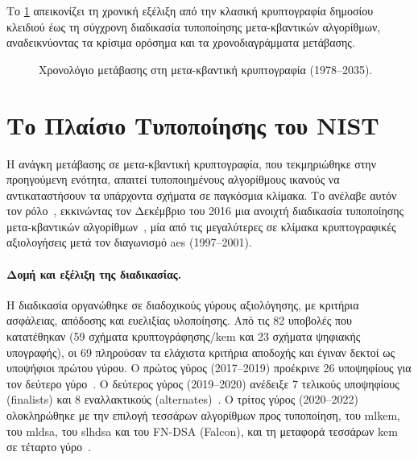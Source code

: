 Το \cref{fig:timeline-pqc} απεικονίζει τη χρονική εξέλιξη από την κλασική
κρυπτογραφία δημοσίου κλειδιού έως τη σύγχρονη διαδικασία τυποποίησης
μετα-κβαντικών αλγορίθμων, αναδεικνύοντας τα κρίσιμα ορόσημα και τα
χρονοδιαγράμματα μετάβασης.

\begin{figure}[htbp]
  \centering
  
  \caption{Χρονολόγιο μετάβασης στη μετα-κβαντική κρυπτογραφία (1978–2035).}
  \label{fig:timeline-pqc}
\end{figure}

\section{Το Πλαίσιο Τυποποίησης του NIST}
\label{sec:nist-standardization}

Η ανάγκη μετάβασης σε μετα-κβαντική κρυπτογραφία, που τεκμηριώθηκε στην
προηγούμενη ενότητα, απαιτεί τυποποιημένους αλγορίθμους ικανούς να
αντικαταστήσουν τα υπάρχοντα σχήματα σε παγκόσμια κλίμακα. Το 
ανέλαβε αυτόν τον ρόλο~\cite{NIST-IR8105}, εκκινώντας τον Δεκέμβριο του 2016 μια ανοιχτή
διαδικασία τυποποίησης μετα-κβαντικών αλγορίθμων~\cite{NIST-PQC-call2016}, μία
από τις μεγαλύτερες σε κλίμακα κρυπτογραφικές αξιολογήσεις μετά τον διαγωνισμό
\gls{aes} (1997–2001).

\paragraph{Δομή και εξέλιξη της διαδικασίας.}
Η διαδικασία οργανώθηκε σε διαδοχικούς γύρους αξιολόγησης, με κριτήρια
ασφάλειας, απόδοσης και ευελιξίας υλοποίησης. Από τις \num{82} υποβολές που κατατέθηκαν (\num{59} σχήματα
κρυπτογράφησης/\gls{kem} και \num{23} σχήματα ψηφιακής υπογραφής), οι
\num{69} πληρούσαν τα ελάχιστα κριτήρια αποδοχής και έγιναν δεκτοί ως υποψήφιοι
πρώτου γύρου. Ο πρώτος γύρος (2017–2019) προέκρινε \num{26} υποψηφίους για τον
δεύτερο γύρο~\cite{NIST-IR8240}. Ο δεύτερος γύρος (2019–2020) ανέδειξε \num{7}
τελικούς υποψηφίους (finalists) και \num{8} εναλλακτικούς
(alternates)~\cite{NIST-IR8309}. Ο τρίτος γύρος (2020–2022) ολοκληρώθηκε με την
επιλογή τεσσάρων αλγορίθμων προς τυποποίηση, του \gls{mlkem}, του \gls{mldsa}, του \gls{slhdsa} και του FN-DSA (Falcon), και τη μεταφορά τεσσάρων \gls{kem}
σε τέταρτο γύρο~\cite{NIST-IR8413}.

